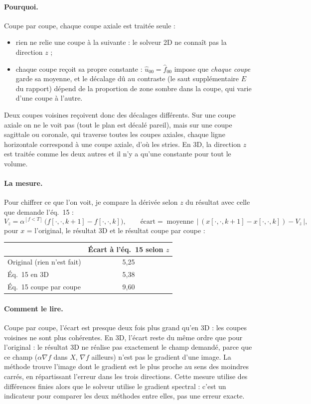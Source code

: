 \documentclass[11pt,a4paper]{article}
\newcommand{\ft}[1]{\widehat{#1}}
\begin{document}
\paragraph{Pourquoi.} Coupe par coupe, chaque coupe axiale est traitée seule :
\begin{itemize}
  \item rien ne relie une coupe à la suivante : le solveur 2D ne connaît pas la direction $z$ ;
  \item chaque coupe reçoit sa propre constante : $\ft u_{00}=\ft f_{00}$ impose que \emph{chaque coupe}
  garde sa moyenne, et le décalage dû au contraste (le saut supplémentaire $E$ du rapport) dépend de la
  proportion de zone sombre dans la coupe, qui varie d'une coupe à l'autre.
\end{itemize}
Deux coupes voisines reçoivent donc des décalages différents. Sur une coupe axiale on ne le voit pas (tout
le plan est décalé pareil), mais sur une coupe sagittale ou coronale, qui traverse toutes les coupes
axiales, chaque ligne horizontale correspond à une coupe axiale, d'où les stries. En 3D, la direction $z$
est traitée comme les deux autres et il n'y a qu'une constante pour tout le volume.

\paragraph{La mesure.} Pour chiffrer ce que l'on voit, je compare la dérivée selon $z$ du résultat avec
celle que demande l'éq.~15 :
\[
  V_z = \alpha^{[f<T]}\,\big(f[\cdot,\cdot,k+1]-f[\cdot,\cdot,k]\big),
  \qquad
  \text{écart} = \operatorname{moyenne}\,\big|\,(x[\cdot,\cdot,k+1]-x[\cdot,\cdot,k]) - V_z\,\big|,
\]
pour $x$ = l'original, le résultat 3D et le résultat coupe par coupe :

\begin{center}
\begin{tabular}{@{}lc@{}}
\toprule
 & Écart à l'éq.~15 selon $z$ \\
\midrule
Original (rien n'est fait) & 5,25 \\
Éq.~15 en 3D & 5,38 \\
Éq.~15 coupe par coupe & 9,60 \\
\bottomrule
\end{tabular}
\end{center}

\paragraph{Comment le lire.} Coupe par coupe, l'écart est presque deux fois plus grand qu'en 3D : les
coupes voisines ne sont plus cohérentes. En 3D, l'écart reste du même ordre que pour l'original : le
résultat 3D ne réalise pas exactement le champ demandé, parce que ce champ ($\alpha\nabla f$ dans $X$,
$\nabla f$ ailleurs) n'est pas le gradient d'une image. La méthode trouve l'image dont le gradient est le
plus proche au sens des moindres carrés, en répartissant l'erreur dans les trois directions. Cette mesure
utilise des différences finies alors que le solveur utilise le gradient spectral : c'est un indicateur
pour comparer les deux méthodes entre elles, pas une erreur exacte.
\end{document}
